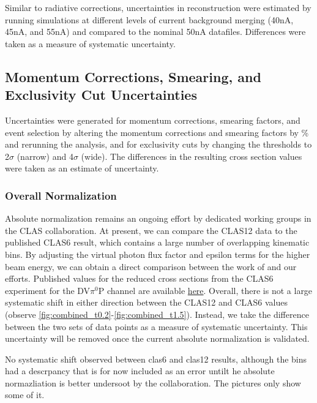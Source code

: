     Similar to radiative corrections, uncertainties in reconstruction were estimated by running simulations at different levels of current background merging (40nA, 45nA, and 55nA) and compared to the nominal 50nA datafiles. Differences were taken as a measure of systematic uncertainty. 

    \subsection*{Momentum Corrections, Smearing, and Exclusivity Cut Uncertainties}
    Uncertainties were generated for momentum corrections, smearing factors, and event selection by altering the momentum corrections and smearing factors by \% and rerunning the analysis, and for exclusivity cuts by changing the thresholds to 2$\sigma$ (narrow) and 4$\sigma$ (wide). The differences in the resulting cross section values were taken as an estimate of uncertainty. 
        
    \subsubsection*{Overall Normalization}

    Absolute normalization remains an ongoing effort by dedicated working groups in the CLAS collaboration. At present, we can compare the CLAS12 data to the published CLAS6 result, which contains a large number of overlapping kinematic bins. By adjusting the virtual photon flux factor and epsilon terms for the higher beam energy, we can obtain a direct comparison between the work of \parencite{Bedlinskiy2014ExclusiveCLAS} and our efforts. Published values for the reduced cross sections from the CLAS6 experiment for the DV$\pi^0$P channel are available \href{https://journals.aps.org/prc/supplemental/10.1103/PhysRevC.90.025205}{here}. Overall, there is not a large systematic shift in either direction between the CLAS12 and CLAS6 values (observe \ref{fig:combined_t0.2}-\ref{fig:combined_t1.5}). Instead, we take the difference between the two sets of data points as a measure of systematic uncertainty. This uncertainty will be removed once the current absolute normalization is validated. 

    

    \iffalse
    No systematic shift observed between clas6 and clas12 results, although the bins had a descrpancy that is for now included as an error untilt he absolute normazliation is better undersoot by the collaboration. The pictures only show some of it. 

